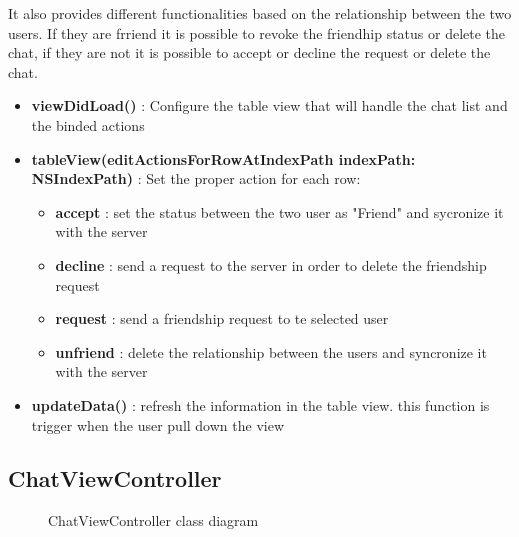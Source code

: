 It also provides different functionalities based on the relationship between the two users. If they are frriend it is possible to revoke the friendhip status or delete the chat, if they are not it is possible to accept or decline the request or delete the chat.

\begin{itemize}

\item \textbf{viewDidLoad()} : Configure the table view that will handle the chat list and the binded actions

\item \textbf{tableView(editActionsForRowAtIndexPath indexPath: NSIndexPath)} : Set the proper action for each row:

\begin{itemize}
\item \textbf{accept} : set the status between the two user as "Friend" and sycronize it with the server
\item \textbf{decline} : send a request to the server in order to delete the friendship request
\item \textbf{request} : send a friendship request to te selected user
\item \textbf{unfriend} : delete the relationship between the users and syncronize it with the server

\end{itemize}

\item \textbf{updateData()} : refresh the information in the table view. this function is trigger when the user pull down the view

\end{itemize}

\newpage
\subsection{ChatViewController} 


\begin{figure}[H]
\caption{ChatViewController class diagram}
\end{figure}

